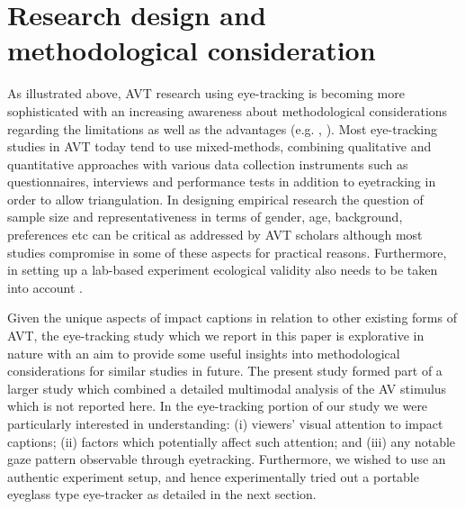 \documentclass[output=paper]{langsci/langscibook}
\begin{document}
\section{Research design and methodological consideration}

As illustrated above, AVT research using eye-tracking is becoming more sophisticated with an increasing awareness about methodological considerations regarding the limitations as well as the advantages (e.g. \citealt{perego2012}, \citealt{Kruger2015}). Most eye-tracking studies in AVT today tend to use mixed-methods, combining qualitative and quantitative approaches with various data collection instruments such as questionnaires, interviews and performance tests in addition to eyetracking in order to allow triangulation. In designing empirical research the question of sample size and representativeness in terms of gender, age, background, preferences etc can be critical as addressed by AVT scholars although most studies compromise in some of these aspects for practical reasons. Furthermore, in setting up a lab-based experiment ecological validity also needs to be taken into account \citep{jakobsen2014}.  


Given the unique aspects of impact captions in relation to other existing forms of AVT, the eye-tracking study which we report in this paper is explorative in nature with an aim to provide some useful insights into methodological considerations for similar studies in future. The present study formed part of a larger study which combined a detailed multimodal analysis of the AV stimulus which is not reported here. In the eye-tracking portion of our study we were particularly interested in understanding: (i) viewers' visual attention to impact captions; (ii) factors which potentially affect such attention; and (iii) any notable gaze pattern observable through eyetracking. Furthermore, we wished to use an authentic experiment setup, and hence experimentally tried out a portable eyeglass type eye-tracker as detailed in the next section. 
\end{document}

